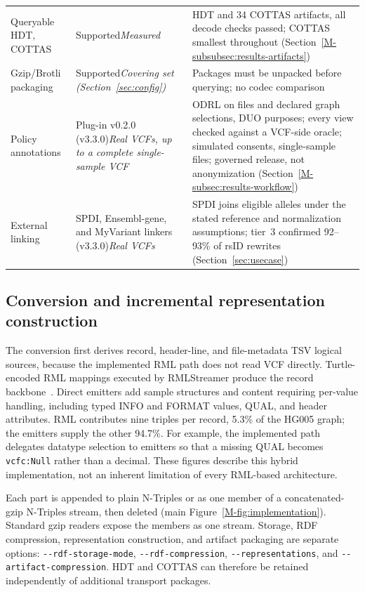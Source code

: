 \documentclass[11pt]{article}
\newcommand{\rowsep}{\noalign{\vskip2pt{\color{black!22}\hrule height 0.4pt}\vskip2pt}}%
\begin{document}
\begin{table}[!htbp]
\begin{tabularx}{\textwidth}{@{}>{\raggedright\arraybackslash}m{}>{\raggedright\arraybackslash}m{}>{\raggedright\arraybackslash}X@{}}
\rowsep
Queryable HDT, COTTAS & Supported\newline\textit{Measured} & 118 HDT and 34 COTTAS artifacts, all decode checks passed; COTTAS smallest throughout (Section~\ref{M-subsubsec:results-artifacts})\\
\rowsep
Gzip/Brotli packaging & Supported\newline\textit{Covering set (Section~\ref{sec:config})} & Packages must be unpacked before querying; no codec comparison\\
\rowsep
Policy annotations & Plug-in v0.2.0 (v3.3.0)\newline\textit{Real VCFs, up to a complete single-sample VCF} & ODRL on files and declared graph selections, DUO purposes; every view checked against a VCF-side oracle; simulated consents, single-sample files; governed release, not anonymization (Section~\ref{M-subsec:results-workflow})\\
\rowsep
External linking & SPDI, Ensembl-gene, and MyVariant linkers (v3.3.0)\newline\textit{Real VCFs} & SPDI joins eligible alleles under the stated reference and normalization assumptions; tier~3 confirmed 92--93\% of rsID rewrites (Section~\ref{sec:usecase})\\
\bottomrule
\end{tabularx}
\end{table}

\subsection{Conversion and incremental representation construction}\label{subsec:model-construction}
The conversion first derives record, header-line, and file-metadata TSV logical sources, because the implemented RML path does not read VCF directly.
Turtle-encoded RML mappings executed by RMLStreamer produce the record backbone~\cite{rml_2024,rmlstreamer_2022}.
Direct emitters add sample structures and content requiring per-value handling, including typed INFO and FORMAT values, QUAL, and header attributes.
RML contributes nine triples per record, 5.3\% of the HG005 graph; the emitters supply the other 94.7\%.
For example, the implemented path delegates datatype selection to emitters so that a missing QUAL becomes \texttt{vcfc:Null} rather than a decimal.
These figures describe this hybrid implementation, not an inherent limitation of every RML-based architecture.

Each part is appended to plain N-Triples or as one member of a concatenated-gzip N-Triples stream, then deleted (main Figure~\ref{M-fig:implementation}).
Standard gzip readers expose the members as one stream.
Storage, RDF compression, representation construction, and artifact packaging are separate options: \texttt{-{}-rdf-storage-mode}, \texttt{-{}-rdf-compression}, \texttt{-{}-representations}, and \texttt{-{}-artifact-compression}.
HDT and COTTAS can therefore be retained independently of additional transport packages.
\end{document}

